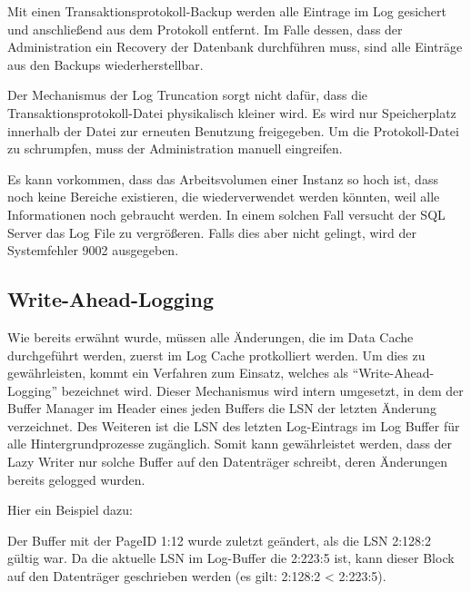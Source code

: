           Mit einen Transaktionsprotokoll-Backup werden alle Eintrage im Log
          gesichert und anschließend aus dem Protokoll entfernt. Im Falle
          dessen, dass der Administration ein Recovery der Datenbank durchführen
          muss, sind alle Einträge aus den Backups wiederherstellbar.
          \begin{merke}
            Der Mechanismus der Log Truncation sorgt nicht dafür, dass die
            Transaktionsprotokoll-Datei physikalisch kleiner wird. Es wird nur
            Speicherplatz innerhalb der Datei zur erneuten Benutzung
            freigegeben. Um die Protokoll-Datei zu schrumpfen, muss der
            Administration manuell eingreifen.
          \end{merke}
          Es kann vorkommen, dass das Arbeitsvolumen einer Instanz so hoch ist,
          dass noch keine Bereiche existieren, die wiederverwendet werden
          könnten, weil alle Informationen noch gebraucht werden.
          In einem solchen Fall versucht der SQL Server das Log File zu
          vergrößeren. Falls dies aber nicht gelingt, wird der Systemfehler 9002
          ausgegeben.
          \begin{literaturinternet}
            \item \cite{ms190925}
          \end{literaturinternet}
      \subsection{Write-Ahead-Logging}
        Wie bereits erwähnt wurde, müssen alle Änderungen, die im Data Cache
        durchgeführt werden, zuerst im Log Cache protkolliert werden.
        Um dies zu gewährleisten, kommt ein Verfahren zum Einsatz, welches als
        \enquote{Write-Ahead-Logging} bezeichnet wird. Dieser Mechanismus wird
        intern umgesetzt, in dem der Buffer Manager im Header eines jeden
        Buffers die LSN der letzten Änderung verzeichnet. Des Weiteren ist die
        LSN des letzten Log-Eintrags im Log Buffer für alle Hintergrundprozesse
        zugänglich. Somit kann gewährleistet werden, dass der Lazy Writer nur
        solche Buffer auf den Datenträger schreibt, deren Änderungen bereits
        gelogged wurden.
        
        Hier ein Beispiel dazu:
        
        Der Buffer mit der PageID 1:12 wurde zuletzt geändert, als die LSN
        2:128:2 gültig war. Da die aktuelle LSN im Log-Buffer die 2:223:5 ist,
        kann dieser Block auf den Datenträger geschrieben werden (es gilt:
        2:128:2 < 2:223:5).
        
